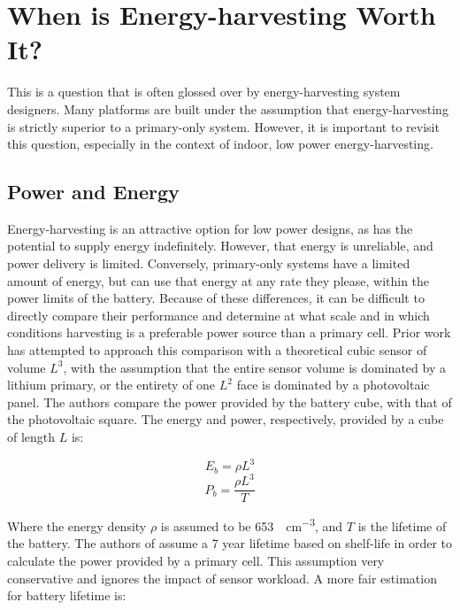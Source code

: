 \section{When is Energy-harvesting Worth It?}
This is a question that is often glossed over by energy-harvesting system designers. Many platforms are built under the assumption that energy-harvesting is strictly superior to a primary-only system. 
However, it is important to revisit this question, especially in the context of indoor, low power energy-harvesting. 

\subsection{Power and Energy}
Energy-harvesting is an attractive option for low power designs, as has the potential to supply energy indefinitely. However, that energy is unreliable, and power delivery is limited. Conversely, primary-only systems have a limited amount of energy, but can use that energy at any rate they please, within the power limits of the battery. 
Because of these differences, it can be difficult to directly compare their performance and determine at what scale and in which conditions harvesting is a preferable power source than a primary cell.
Prior work has attempted to approach this comparison with a theoretical cubic sensor of volume $L^3$, with the assumption that the entire sensor volume is dominated by a lithium primary, or the entirety of one $L^2$ face is dominated by a photovoltaic panel.
The authors compare the power provided by the battery cube, with that of the photovoltaic square. 
The energy and power, respectively, provided by a cube of length $L$ is: 

\begin{equation} \label{eqn:intuition:b_energy}
E_b = \rho L^3
\end{equation}
\begin{equation} \label{eqn:intuition:b_power}
P_b = \frac{\rho L^3}{T}
\end{equation}

\noindent Where the energy density $\rho$ is assumed to be 653\si{\milli\Wh\per\cm\cubed}, and $T$ is the lifetime of the battery.
The authors of \cite{yervaGrafting12} assume a 7 year lifetime based on shelf-life in order to calculate the power provided by a primary cell. This assumption very conservative and ignores the impact of sensor workload. 
A more fair estimation for battery lifetime is:

